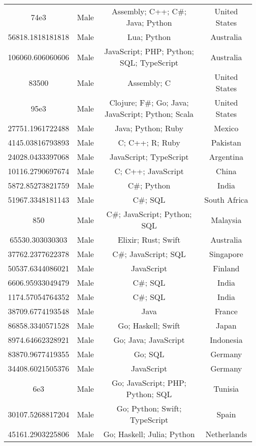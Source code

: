 \begin{center}
\begin{tabular}{ |c|c|c|c| }
74e3  &  Male  &  Assembly; C++; C\#; Java; Python  &  United States  \\ 
56818.1818181818  &  Male  &  Lua; Python  &  Australia  \\ 
106060.606060606  &  Male  &  JavaScript; PHP; Python; SQL; TypeScript  &  Australia  \\ 
83500  &  Male  &  Assembly; C  &  United States  \\ 
95e3  &  Male  &  Clojure; F\#; Go; Java; JavaScript; Python; Scala  &  United States  \\ 
27751.1961722488  &  Male  &  Java; Python; Ruby  &  Mexico  \\ 
4145.03816793893  &  Male  &  C; C++; R; Ruby  &  Pakistan  \\ 
24028.0433397068  &  Male  &  JavaScript; TypeScript  &  Argentina  \\ 
10116.2790697674  &  Male  &  C; C++; JavaScript  &  China  \\ 
5872.85273821759  &  Male  &  C\#; Python  &  India  \\ 
51967.3348181143  &  Male  &  C\#; SQL  &  South Africa  \\ 
850  &  Male  &  C\#; JavaScript; Python; SQL  &  Malaysia  \\ 
65530.303030303  &  Male  &  Elixir; Rust; Swift  &  Australia  \\ 
37762.2377622378  &  Male  &  C\#; JavaScript; SQL  &  Singapore  \\ 
50537.6344086021  &  Male  &  JavaScript  &  Finland  \\ 
6606.95933049479  &  Male  &  C\#; SQL  &  India  \\ 
1174.57054764352  &  Male  &  C\#; SQL  &  India  \\ 
38709.6774193548  &  Male  &  Java  &  France  \\ 
86858.3340571528  &  Male  &  Go; Haskell; Swift  &  Japan  \\ 
8974.64662328921  &  Male  &  Go; Java; JavaScript  &  Indonesia  \\ 
83870.9677419355  &  Male  &  Go; SQL  &  Germany  \\ 
34408.6021505376  &  Male  &  JavaScript  &  Germany  \\ 
6e3  &  Male  &  Go; JavaScript; PHP; Python; SQL  &  Tunisia  \\ 
30107.5268817204  &  Male  &  Go; Python; Swift; TypeScript  &  Spain  \\ 
45161.2903225806  &  Male  &  Go; Haskell; Julia; Python  &  Netherlands  \\ 

\end{tabular}
\end{center}
